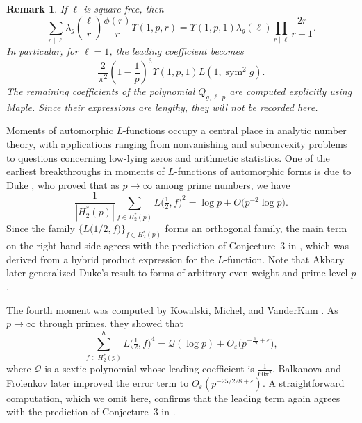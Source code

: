 \documentclass[12pt]{amsart}
\theoremstyle{plain}
\newtheorem*{rem*}{Remark}
\theoremstyle{definition}
\begin{document}

\begin{rem*}
If $\ell$ is square-free, then
\[
\sum_{r\mid \ell}
\lambda_g\left(\frac{\ell}{r}\right)
\frac{\phi(r)}{r}
\Upsilon(1,p,r) 
=
\Upsilon(1,p,1)\lambda_g(\ell)
\prod_{r\mid \ell}\frac{2r}{r+1}.
\]
In particular, for $\ell=1$, the leading coefficient becomes
\[
\frac{2}{\pi^2}
\left(1-\frac1p\right)^3
\Upsilon(1,p,1)
L(1,\operatorname{sym}^2 g).
\]
The remaining coefficients of the polynomial $Q_{g,\ell,p}$  are computed explicitly using Maple. Since their expressions are lengthy, they will not be recorded here.
\end{rem*}




Moments of automorphic $L$-functions occupy a central place in analytic number theory, with applications ranging from nonvanishing and subconvexity problems to questions concerning low-lying zeros and arithmetic statistics. One of the earliest breakthroughs in moments of $L$-functions of automorphic forms is due to Duke \cite{Duke}, who proved that as $p\to\infty$ among prime numbers, we have
\[
\frac{1}{|H_2^*(p)|}\sum_{f\in H_2^*(p)} L\Big(\tfrac12,f\Big)^2
= \log p + O\big(p^{-2}\log p\big).
\]
Since the family $\displaystyle\{L\big(1/2,f\big)\}_{f\in H_2^*(p)}$ forms an orthogonal family, the main term on the right-hand side agrees with the prediction of Conjecture~3 in \cite{BK}, which was derived from a hybrid product expression for the $L$-function. Note that Akbary \cite{Akbary} later generalized Duke's result to forms of arbitrary even weight and prime level $p$.

The fourth moment was computed by Kowalski, Michel, and VanderKam \cite{KMV Mol}. As $p\to\infty$ through primes, they showed that
\begin{equation}\label{eq:KVM 4th moment}
\sum_{f\in H_2^*(p)}^h L\Big(\tfrac12,f\Big)^4
= \mathcal{Q}(\log p) + O_\varepsilon\big(p^{-\frac1{12}+\varepsilon}\big),
\end{equation}
where $\mathcal{Q}$ is a sextic polynomial whose leading coefficient is $\frac{1}{60\pi^2}$. Balkanova and Frolenkov \cite{BF} later improved the error term to $O_\varepsilon(p^{-25/228+\varepsilon})$. A straightforward computation, which we omit here, confirms that the leading term again agrees with the prediction of Conjecture~3 in \cite{BK}.
\end{document}
